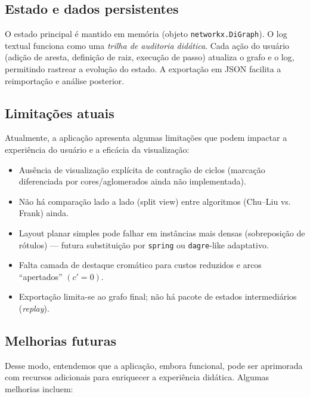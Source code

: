 \subsection{Estado e dados persistentes}

O estado principal é mantido em memória (objeto \texttt{networkx.DiGraph}). O log textual funciona como uma \emph{trilha de auditoria didática}. Cada ação do usuário (adição de aresta, definição de raiz, execução de passo) atualiza o grafo e o log, permitindo rastrear a evolução do estado. A exportação em JSON facilita a reimportação e análise posterior.

\subsection{Limitações atuais}

Atualmente, a aplicação apresenta algumas limitações que podem impactar a experiência do usuário e a eficácia da visualização:

\begin{itemize}\setlength{\itemsep}{2pt}
	\item Ausência de visualização explícita de contração de ciclos (marcação diferenciada por cores/aglomerados ainda não implementada).
	\item Não há comparação lado a lado (split view) entre algoritmos (Chu--Liu vs. Frank) ainda.
	\item Layout planar simples pode falhar em instâncias mais densas (sobreposição de rótulos) — futura substituição por \texttt{spring} ou \texttt{dagre}-like adaptativo.
	\item Falta camada de destaque cromático para custos reduzidos e arcos “apertados” \((c' = 0)\).
	\item Exportação limita-se ao grafo final; não há pacote de estados intermediários (\emph{replay}).
\end{itemize}

\subsection{Melhorias futuras}

Desse modo, entendemos que a aplicação, embora funcional, pode ser aprimorada com recursos adicionais para enriquecer a experiência didática. Algumas melhorias incluem:

